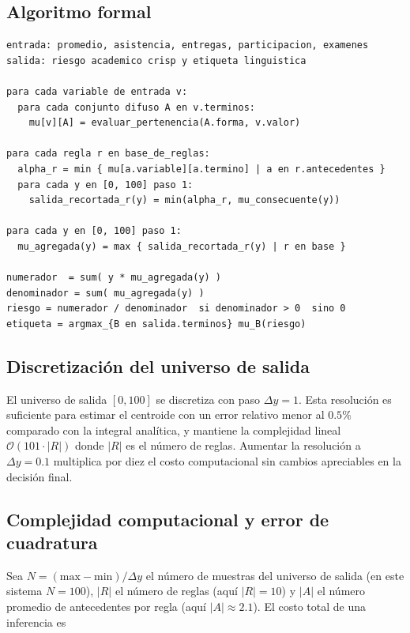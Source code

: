 \subsection{Algoritmo formal}

\begin{lstlisting}[caption={Pseudocódigo del motor difuso},label=lst:pseudocodigo]
entrada: promedio, asistencia, entregas, participacion, examenes
salida: riesgo academico crisp y etiqueta linguistica

para cada variable de entrada v:
  para cada conjunto difuso A en v.terminos:
    mu[v][A] = evaluar_pertenencia(A.forma, v.valor)

para cada regla r en base_de_reglas:
  alpha_r = min { mu[a.variable][a.termino] | a en r.antecedentes }
  para cada y en [0, 100] paso 1:
    salida_recortada_r(y) = min(alpha_r, mu_consecuente(y))

para cada y en [0, 100] paso 1:
  mu_agregada(y) = max { salida_recortada_r(y) | r en base }

numerador  = sum( y * mu_agregada(y) )
denominador = sum( mu_agregada(y) )
riesgo = numerador / denominador  si denominador > 0  sino 0
etiqueta = argmax_{B en salida.terminos} mu_B(riesgo)
\end{lstlisting}

\subsection{Discretización del universo de salida}

El universo de salida $[0,100]$ se discretiza con paso $\Delta y = 1$. Esta resolución es suficiente para estimar el centroide con un error relativo menor al $0.5\%$ comparado con la integral analítica, y mantiene la complejidad lineal $\mathcal{O}(101 \cdot |R|)$ donde $|R|$ es el número de reglas. Aumentar la resolución a $\Delta y = 0.1$ multiplica por diez el costo computacional sin cambios apreciables en la decisión final.

\subsection{Complejidad computacional y error de cuadratura}

Sea $N=(\text{max}-\text{min})/\Delta y$ el número de muestras del universo de salida (en este sistema $N=100$), $|R|$ el número de reglas (aquí $|R|=10$) y $|A|$ el número promedio de antecedentes por regla (aquí $|A|\approx 2.1$). El costo total de una inferencia es

